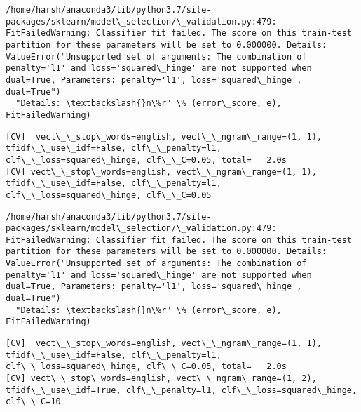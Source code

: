 \documentclass[11pt]{article}
\begin{document}
    \begin{Verbatim}[commandchars=\\\{\}]
/home/harsh/anaconda3/lib/python3.7/site-packages/sklearn/model\_selection/\_validation.py:479: FitFailedWarning: Classifier fit failed. The score on this train-test partition for these parameters will be set to 0.000000. Details: 
ValueError("Unsupported set of arguments: The combination of penalty='l1' and loss='squared\_hinge' are not supported when dual=True, Parameters: penalty='l1', loss='squared\_hinge', dual=True")
  "Details: \textbackslash{}n\%r" \% (error\_score, e), FitFailedWarning)

    \end{Verbatim}

    \begin{Verbatim}[commandchars=\\\{\}]
[CV]  vect\_\_stop\_words=english, vect\_\_ngram\_range=(1, 1), tfidf\_\_use\_idf=False, clf\_\_penalty=l1, clf\_\_loss=squared\_hinge, clf\_\_C=0.05, total=   2.0s
[CV] vect\_\_stop\_words=english, vect\_\_ngram\_range=(1, 1), tfidf\_\_use\_idf=False, clf\_\_penalty=l1, clf\_\_loss=squared\_hinge, clf\_\_C=0.05 

    \end{Verbatim}

    \begin{Verbatim}[commandchars=\\\{\}]
/home/harsh/anaconda3/lib/python3.7/site-packages/sklearn/model\_selection/\_validation.py:479: FitFailedWarning: Classifier fit failed. The score on this train-test partition for these parameters will be set to 0.000000. Details: 
ValueError("Unsupported set of arguments: The combination of penalty='l1' and loss='squared\_hinge' are not supported when dual=True, Parameters: penalty='l1', loss='squared\_hinge', dual=True")
  "Details: \textbackslash{}n\%r" \% (error\_score, e), FitFailedWarning)

    \end{Verbatim}

    \begin{Verbatim}[commandchars=\\\{\}]
[CV]  vect\_\_stop\_words=english, vect\_\_ngram\_range=(1, 1), tfidf\_\_use\_idf=False, clf\_\_penalty=l1, clf\_\_loss=squared\_hinge, clf\_\_C=0.05, total=   2.0s
[CV] vect\_\_stop\_words=english, vect\_\_ngram\_range=(1, 2), tfidf\_\_use\_idf=True, clf\_\_penalty=l1, clf\_\_loss=squared\_hinge, clf\_\_C=10 

    \end{Verbatim}
\end{document}
